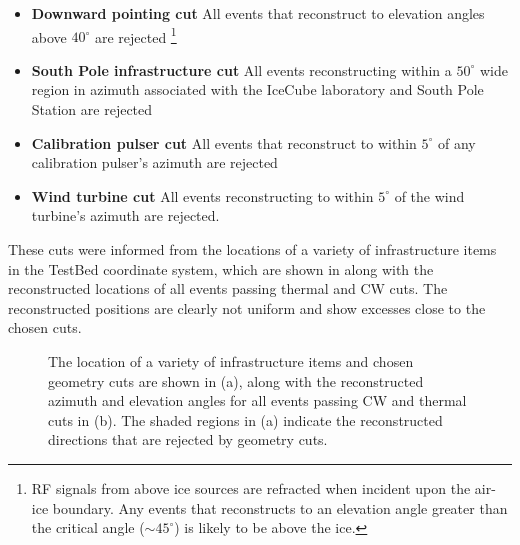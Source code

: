 \begin{itemize}

\item \textbf{Downward pointing cut} All events that reconstruct to elevation angles above $40^\circ$ are rejected \footnote{RF signals from above ice sources are refracted when incident upon the air-ice boundary. Any events that reconstructs to an elevation angle greater than the critical angle ($\sim 45^{\circ}$) is likely to be above the ice.}

\item \textbf{South Pole infrastructure cut} All events reconstructing within a $50^\circ$ wide region in azimuth associated with the IceCube laboratory and South Pole Station are rejected

\item \textbf{Calibration pulser cut} All events that reconstruct to within $5^\circ$ of any calibration pulser's azimuth are rejected

\item \textbf{Wind turbine cut} All events reconstructing to within $5^\circ$ of the wind turbine's azimuth are rejected.

\end{itemize}

These cuts were informed from the locations of a variety of infrastructure items in the TestBed coordinate system, which are shown in  along with the reconstructed locations of all events passing thermal and CW cuts. The reconstructed positions are clearly not uniform and show excesses close to the chosen cuts.

\begin{figure}[htpb]
  \hfill

  \caption{The location of a variety of infrastructure items and chosen geometry cuts are shown in (a), along with the reconstructed azimuth and elevation angles for all events passing CW and thermal cuts in (b). The shaded regions in (a) indicate the reconstructed directions that are rejected by geometry cuts.}
  \label{fig:Analysis:Anthropogenic-Cuts:Geometry-Cuts:VPol-Reco}
\end{figure}

